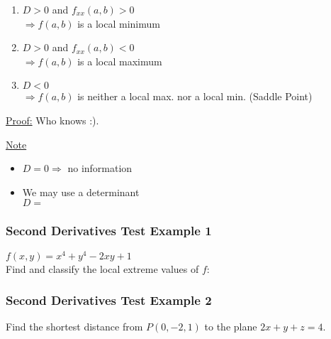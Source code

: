 \documentclass[12pt]{article}
\begin{document}
\fbox{
	\begin{minipage}{3.5in}
		\[
		D = D(a,b) = f_{xx}(a,b)f_{yy}(a,b) - [f_{xy}(a,b)]^2
		\]
	\end{minipage}
}

\begin{enumerate}
	\item \(D>0\) and \(f_{xx}(a,b) > 0\) \\
		\(\Rightarrow f(a,b)\) is a local minimum
	\item \(D>0\) and \(f_{xx}(a,b) < 0\)\\
		\(\Rightarrow f(a,b)\) is a local maximum
	\item \(D<0\) \\
		\(\Rightarrow f(a,b)\) is neither a local max. nor a local min. (Saddle Point)
\end{enumerate}

\underline{Proof:} Who knows :).

\underline{Note}
\begin{itemize}
	\item \(D=0 \Rightarrow \) no information
	\item We may use a determinant \\
		\(D = \)
\end{itemize}
\subsubsection{Second Derivatives Test Example 1}
\(f(x,y) = x^4 + y^4 -2xy + 1\) \\
Find and classify the local extreme values of \(f\): 

\subsubsection{Second Derivatives Test Example 2}
Find the shortest distance from \(P(0,-2,1)\) to the plane \(2x + y + z = 4\).
\end{document}

